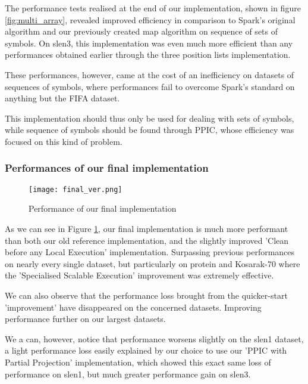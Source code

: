 \documentclass{eplmastersthesis}
\begin{document}
The performance tests realised at the end of our implementation, shown in figure \ref{fig:multi_array}, revealed improved efficiency in comparison to Spark's original algorithm and our previously created map algorithm on sequence of sets of symbols. On slen3, this implementation was even much more efficient than any performances obtained earlier through the three position lists implementation. \newline

These performances, however, came at the cost of an inefficiency on datasets of sequences of symbols, where performances fail to overcome Spark's standard on anything but the FIFA dataset. \newline

This implementation should thus only be used for dealing with sets of symbols, while sequence of symbols should be found through PPIC, whose efficiency was focused on this kind of problem.

\subsubsection{Performances of our final implementation}

\begin{figure}[h]
  \centering
  \texttt{[image: final\_ver.png]}
  \caption{Performance of our final implementation}
  \label{fig:final_ver}
\end{figure}

As we can see in Figure \ref{fig:final_ver}, our final implementation is much more performant than both our old reference implementation, and the slightly improved 'Clean before any Local Execution' implementation. Surpassing previous performances on nearly every single dataset, but particularly on protein and Kosarak-70 where the 'Specialised Scalable Execution' improvement was extremely effective. \newline

We can also observe that the performance loss brought from the quicker-start 'improvement' have disappeared on the concerned datasets. Improving performance further on our largest datasets. \newline

We a can, however, notice that performance worsens slightly on the slen1 dataset, a light performance loss easily explained by our choice to use our 'PPIC with Partial Projection' implementation, which showed this exact same loss of performance on slen1, but much greater performance gain on slen3. \newline
\end{document}
